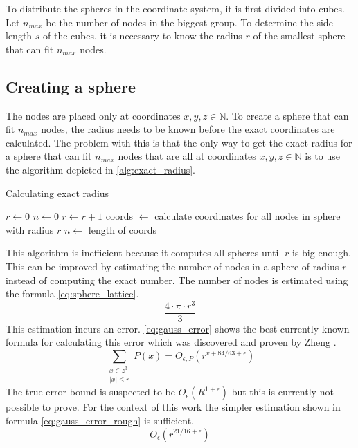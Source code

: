 To distribute the spheres in the coordinate system, it is first divided into cubes. Let $n_{max}$ be the number of nodes in the biggest group. To determine the side length $s$ of the cubes, it is necessary to know the radius $r$ of the smallest sphere that can fit $n_{max}$ nodes.

\subsection{Creating a sphere}
The nodes are placed only at coordinates $x,y,z \in \mathbb{N}$. To create a sphere that can fit $n_{max}$ nodes, the radius needs to be known before the exact coordinates are calculated. The problem with this is that the only way to get the exact radius for a sphere that can fit $n_{max}$ nodes that are all at coordinates $x,y,z \in \mathbb{N}$ is to use the algorithm depicted in \ref{alg:exact_radius}.
\begin{algorithm}
\caption{Calculating exact radius}
\label{alg:exact_radius}
\begin{algorithmic}
\State $r \gets 0$
\State $n \gets 0$
    \State $r \gets r+1$
    \State coords $\gets$ calculate coordinates for all nodes in sphere with radius $r$
    \State $n \gets $ length of coords
\EndWhile
\end{algorithmic}
\end{algorithm}
This algorithm is inefficient because it computes all spheres until $r$ is big enough. This can be improved by estimating the number of nodes in a sphere of radius $r$ instead of computing the exact number. The number of nodes is estimated using the formula \ref{eq:sphere_lattice}.
\begin{equation}
\label{eq:sphere_lattice}
    \dfrac{4 \cdot \pi \cdot r^3}{3}
\end{equation}
This estimation incurs an error. \ref{eq:gauss_error} shows the best currently known formula for calculating this error which was discovered and proven by Zheng \cite{gaussSphereProblem}.
\begin{equation}
\label{eq:gauss_error}
    \sum_{\substack{x \in z^3 \\ |x| \leq r}}{P(x)} = O_{\epsilon, P}(r^{v + 84 / 63 + \epsilon})
\end{equation}
The true error bound is suspected to be $O_\epsilon(R^{1 + \epsilon})$ but this is currently not possible to prove. For the context of this work the simpler estimation shown in formula \ref{eq:gauss_error_rough} is sufficient.
\begin{equation}
\label{eq:gauss_error_rough}
    O_{\epsilon}(r^{21/16 + \epsilon})
\end{equation}

